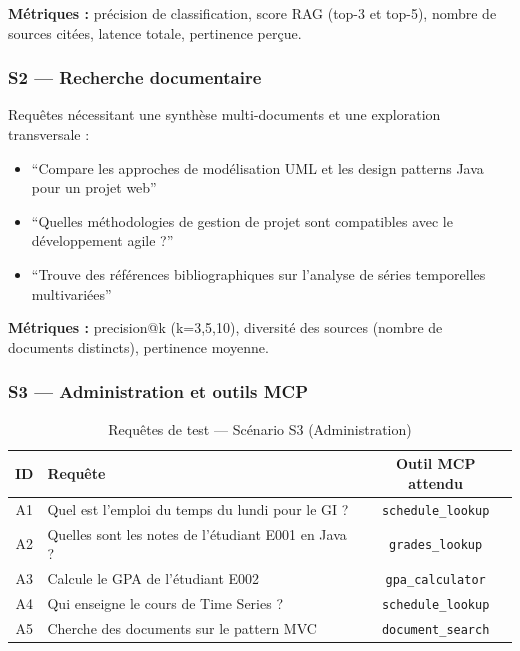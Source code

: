\documentclass[12pt, a4paper]{article}
\begin{document}
\textbf{Métriques :} précision de classification, score RAG (top-3 et top-5), nombre de sources citées, latence totale, pertinence perçue.

\subsubsection{S2 — Recherche documentaire}

Requêtes nécessitant une synthèse multi-documents et une exploration transversale :

\begin{itemize}
  \item ``Compare les approches de modélisation UML et les design patterns Java pour un projet web''
  \item ``Quelles méthodologies de gestion de projet sont compatibles avec le développement agile ?''
  \item ``Trouve des références bibliographiques sur l'analyse de séries temporelles multivariées''
\end{itemize}

\textbf{Métriques :} precision@k (k=3,5,10), diversité des sources (nombre de documents distincts), pertinence moyenne.

\subsubsection{S3 — Administration et outils MCP}

\begin{table}[H]
\centering
\caption{Requêtes de test — Scénario S3 (Administration)}
\label{tab:s3_queries}
\small
\begin{tabularx}{\textwidth}{c X c}
\toprule
\textbf{ID} & \textbf{Requête} & \textbf{Outil MCP attendu} \\
\midrule
A1 & Quel est l'emploi du temps du lundi pour le GI ? & \texttt{schedule\_lookup} \\
A2 & Quelles sont les notes de l'étudiant E001 en Java ? & \texttt{grades\_lookup} \\
A3 & Calcule le GPA de l'étudiant E002 & \texttt{gpa\_calculator} \\
A4 & Qui enseigne le cours de Time Series ? & \texttt{schedule\_lookup} \\
A5 & Cherche des documents sur le pattern MVC & \texttt{document\_search} \\
\bottomrule
\end{tabularx}
\end{table}
\end{document}
